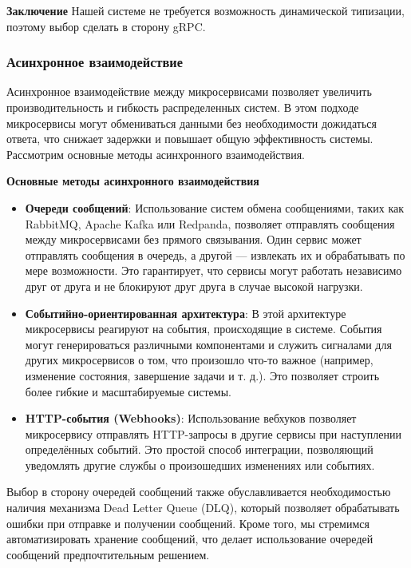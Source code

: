 \textbf{Заключение}
Нашей системе не требуется возможность динамической типизации, поэтому выбор сделать в сторону gRPC.

\subsubsection{Асинхронное взаимодействие} %



Асинхронное взаимодействие между микросервисами позволяет увеличить производительность и гибкость распределенных систем. В этом подходе микросервисы могут обмениваться данными без необходимости дожидаться ответа, что снижает задержки и повышает общую эффективность системы. Рассмотрим основные методы асинхронного взаимодействия.


\textbf{Основные методы асинхронного взаимодействия}
\begin{itemize}
    \item \textbf{Очереди сообщений}: Использование систем обмена сообщениями, таких как RabbitMQ, Apache Kafka или Redpanda, позволяет отправлять сообщения между микросервисами без прямого связывания. Один сервис может отправлять сообщения в очередь, а другой — извлекать их и обрабатывать по мере возможности. Это гарантирует, что сервисы могут работать независимо друг от друга и не блокируют друг друга в случае высокой нагрузки.
    \item \textbf{Событийно-ориентированная архитектура}: В этой архитектуре микросервисы реагируют на события, происходящие в системе. События могут генерироваться различными компонентами и служить сигналами для других микросервисов о том, что произошло что-то важное (например, изменение состояния, завершение задачи и т. д.). Это позволяет строить более гибкие и масштабируемые системы.
    \item \textbf{HTTP-события (Webhooks)}: Использование вебхуков позволяет микросервису отправлять HTTP-запросы в другие сервисы при наступлении определённых событий. Это простой способ интеграции, позволяющий уведомлять другие службы о произошедших изменениях или событиях.
\end{itemize}

Выбор в сторону очередей сообщений также обуславливается необходимостью наличия механизма Dead Letter Queue (DLQ), который позволяет обрабатывать ошибки при отправке и получении сообщений. Кроме того, мы стремимся автоматизировать хранение сообщений, что делает использование очередей сообщений предпочтительным решением.


